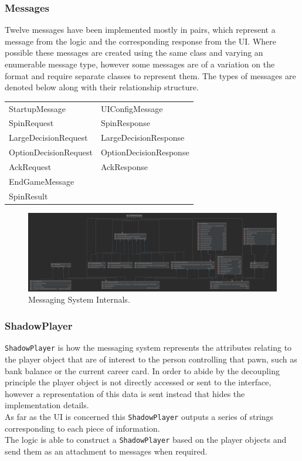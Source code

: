 \documentclass[a4paper, 11pt]{article}
\begin{document}
	\subsubsection*{Messages}
	Twelve messages have been implemented mostly in pairs, which represent a message from the logic and the corresponding response from the UI. Where possible these messages are created using the same class and varying an enumerable message type, however some messages are of a variation on the format and require separate classes to represent them. The types of messages are denoted below along with their relationship structure.
	\begin{table}[!ht]
		\begin{center} 
			\begin{tabular}{ll} 
				StartupMessage&UIConfigMessage\\
				SpinRequest&SpinResponse\\
				LargeDecisionRequest&LargeDecisionResponse\\
				OptionDecisionRequest&OptionDecisionResponse\\
				AckRequest&AckResponse\\
				EndGameMessage&\\
				SpinResult&\\	
			\end{tabular}
		\end{center}
	\end{table}
	\begin{figure}[H]
		\centering
		\includegraphics[scale=.125]{uml/messaging_internals_uml}
		\caption{Messaging System Internals.}
		\label{fig:messages_uml}
	\end{figure}
	\subsubsection*{ShadowPlayer}
	\texttt{ShadowPlayer} is how the messaging system represents the attributes relating to the player object that are of interest to the person controlling that pawn, such as bank balance or the current career card.	
	In order to abide by the decoupling principle the player object is not directly accessed or sent to the interface, however a representation of this data is sent instead that hides the implementation details.\\	
	As far as the UI is concerned this \texttt{ShadowPlayer} outputs a series of strings corresponding to each piece of information.\\
	The logic is able to construct a \texttt{ShadowPlayer} based on the player objects and send them as an attachment to messages when required.
\end{document}
